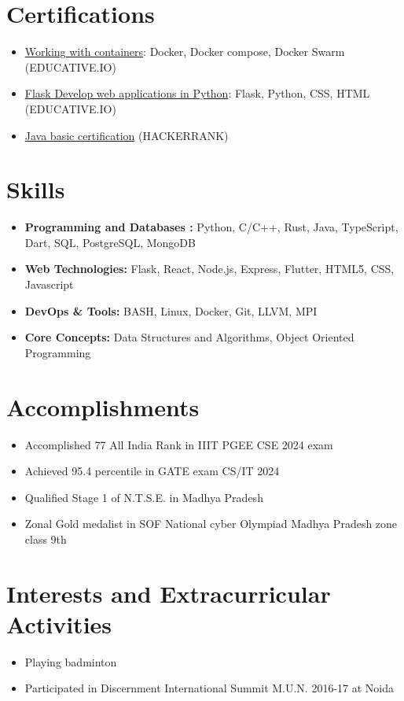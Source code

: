 \documentclass{article}
\begin{document}
\section*{Certifications}
\begin{itemize}
	\item \href{https://www.educative.io/verify-certificate/Y5xyKBov0ppTp41gXrqlx5c3LGP7RAWBVHJ}{Working with containers}: Docker, Docker compose, Docker Swarm (EDUCATIVE.IO)
	\item \href{https://www.educative.io/verify-certificate/j2l3BzfZ3O94zqGqKSjXR9PNLqr7uA}{Flask Develop web applications in Python}: Flask, Python, CSS, HTML (EDUCATIVE.IO)
	\item \href{https://www.hackerrank.com/certificates/388867dc0d5f}{Java basic certification} (HACKERRANK)
\end{itemize}

\section*{Skills}
\begin{itemize}[leftmargin=*, itemsep=0pt, parsep=0pt]
	\item \textbf{Programming and Databases :} Python, C/C++, Rust, Java, TypeScript, Dart, SQL, PostgreSQL, MongoDB
	\item \textbf{Web Technologies:} Flask, React, Node.js, Express, Flutter, HTML5, CSS, Javascript
	\item \textbf{DevOps \& Tools:} BASH, Linux, Docker, Git, LLVM, MPI
	\item \textbf{Core Concepts:} Data Structures and Algorithms, Object Oriented Programming
\end{itemize}

\section*{Accomplishments}
\begin{itemize}
	\item Accomplished 77 All India Rank in IIIT PGEE CSE 2024 exam
	\item Achieved 95.4 percentile in GATE exam CS/IT 2024
	\item Qualified Stage 1 of N.T.S.E. in Madhya Pradesh
	\item Zonal Gold medalist in SOF National cyber Olympiad Madhya Pradesh zone class 9th
\end{itemize}

\section*{Interests and Extracurricular Activities}
\begin{itemize}
	\item Playing badminton
	\item Participated in Discernment International Summit M.U.N. 2016-17 at Noida
\end{itemize}
\end{document}
